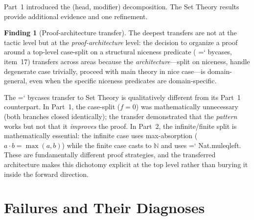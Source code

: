 \documentclass[11pt]{article}
\renewcommand{\texttt}[1]{%
  \begingroup\ttfamily\hyphenchar\font=`\-\relax
  \def\_{\textunderscore\discretionary{}{}{}}%
  #1\endgroup}
\theoremstyle{definition}
\newtheorem{finding}[theorem]{Finding}
\theoremstyle{remark}
\begin{document}
Part~1 introduced the (head, modifier) decomposition.  The Set Theory
results provide additional evidence and one refinement.

\begin{finding}[Proof-architecture transfer]\label{find:architecture}
The deepest transfers are not at the tactic level but at the
\emph{proof-architecture} level: the decision to organize a proof
around a top-level case-split on a structural niceness predicate
(\texttt{by\_cases}, item~17) transfers across areas because the
\emph{architecture}---split on niceness, handle degenerate case
trivially, proceed with main theory in nice case---is domain-general,
even when the specific niceness predicates are domain-specific.
\end{finding}

The \texttt{by\_cases} transfer to Set Theory is qualitatively
different from its Part~1 counterpart.  In Part~1, the case-split
($f = 0$) was mathematically unnecessary (both branches closed
identically); the transfer demonstrated that the \emph{pattern}
works but not that it \emph{improves} the proof.  In Part~2, the
infinite/finite split is mathematically essential: the infinite
case uses max-absorption ($a \cdot b = \max(a, b)$) while the
finite case casts to $\mathbb{N}$ and uses \texttt{Nat.mul\_eq\_left}.
These are fundamentally different proof strategies, and the
transferred architecture makes this dichotomy explicit at the top
level rather than burying it inside the forward direction.

\section{Failures and Their Diagnoses}\label{sec:failures}
\end{document}

